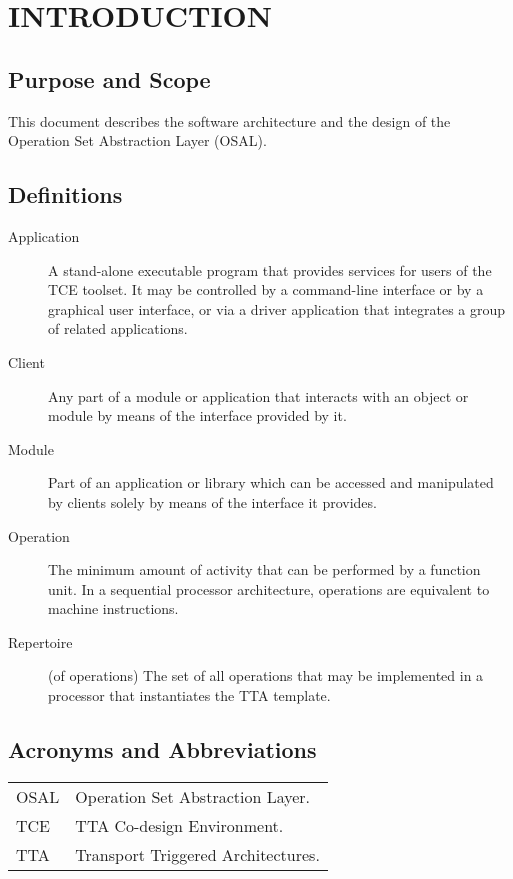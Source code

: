 \documentclass[a4paper,twoside]{tce}
\begin{document}
\tableofcontents



\chapter{INTRODUCTION}

\section{Purpose and Scope}

This document describes the software architecture and the design of the
Operation Set Abstraction Layer (OSAL).


\section{Definitions}

\begin{description}
\item[Application]%
  A stand-alone executable program that provides services for users of the
  TCE toolset. It may be controlled by a command-line interface or by a
  graphical user interface, or via a driver application that integrates a
  group of related applications.
\item[Client]%
  Any part of a module or application that interacts with an object or
  module by means of the interface provided by it.
\item[Module]%
  Part of an application or library which can be accessed and manipulated by
  clients solely by means of the interface it provides.
\item[Operation] %
  The minimum amount of activity that can be performed by a function unit.
  In a sequential processor architecture, operations are equivalent to
  machine instructions.
\item[Repertoire] (of operations) %
  The set of all operations that may be implemented in a processor that
  instantiates the TTA template.
\end{description}



\section{Acronyms and Abbreviations}

\begin{table}[htb]
\begin{center}
\begin{tabular}{p{}p{}}
OSAL  & Operation Set Abstraction Layer.  \\
TCE   & TTA Co-design Environment. \\
TTA   & Transport Triggered Architectures. \\
\end{tabular}
\end{center}
\end{table}
\end{document}
